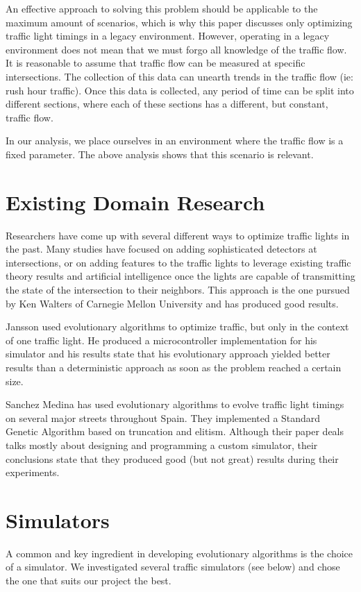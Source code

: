 \documentclass{article} %
\begin{document}
An effective approach to solving this problem should be applicable to the maximum amount of scenarios, which is why this paper discusses only optimizing traffic light timings in a legacy environment.
However, operating in a legacy environment does not mean that we must forgo all knowledge of the traffic flow. It is reasonable to assume that traffic flow can be measured at specific intersections. The collection of this data can unearth trends in the traffic flow (ie: rush hour traffic). Once this data is collected, any period of time can be split into different sections, where each of these sections has a different, but constant, traffic flow.


In our analysis, we place ourselves in an environment where the traffic flow is a fixed parameter. The above analysis shows that this scenario is relevant.

\section{Existing Domain Research}
Researchers have come up with several different ways to optimize traffic lights in the past. Many studies have focused on adding sophisticated detectors at intersections, or on adding features to the traffic lights to leverage existing traffic theory results and artificial intelligence once the lights are capable of transmitting the state of the intersection to their neighbors. This approach is the one pursued by Ken Walters of Carnegie Mellon University and has produced good results.

Jansson used evolutionary algorithms to optimize traffic, but only in the context of one traffic light. He produced a microcontroller implementation for his simulator and his results state that his evolutionary approach yielded better results than a deterministic approach as soon as the problem reached a certain size.

Sanchez Medina has used evolutionary algorithms to evolve traffic light timings on several major streets throughout Spain. They implemented a Standard Genetic Algorithm based on truncation and elitism. Although their paper deals talks mostly about designing and programming a custom simulator, their conclusions state that they produced good (but not great) results during their experiments.


\section{Simulators}
A common and key ingredient in developing evolutionary algorithms is the choice of a simulator. We investigated several traffic simulators (see below) and chose the one that suits our project the best.
\end{document}
